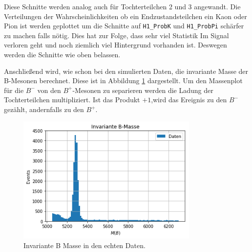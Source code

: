 Diese Schnitte werden analog auch f\"ur Tochterteilchen 2 und 3 angewandt.
Die Verteilungen der Wahrscheinlichkeiten ob ein Endzustandsteilchen ein Kaon oder Pion ist werden geplottet um die Schnitte auf \texttt{H1\_ProbK} und \texttt{H1\_ProbPi} sch\"arfer zu machen falls nötig.
Dies hat zur Folge, dass sehr viel Statistik Im Signal verloren geht und noch ziemlich viel Hintergrund vorhanden ist. Deswegen werden die Schnitte wie oben belassen.

Anschlie\ss end wird, wie schon bei den simulierten Daten, die invariante Masse der B-Mesonen berechnet. Diese ist in Abbildung \ref{fig:realBMass} dargestellt. Um den Massenplot f\"ur die $B^{-}$ von den $B^{+}$-Mesonen zu separieren werden die Ladung der Tochterteilchen multipliziert. Ist das Produkt $+1$,wird das Ereignis zu den $B^{-}$ gez\"ahlt, andernfalls zu den $B^{+}$.

\begin{figure}[!htb]
  \centering
  \includegraphics[width=0.8\textwidth]{plots/real_data_inv_masse_B.png}
  \caption{Invariante B Masse in den echten Daten.}
  \label{fig:realBMass}
\end{figure}
